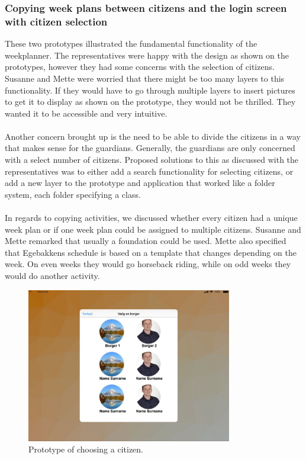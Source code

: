 \subsubsection{Copying week plans between citizens and the login screen with citizen selection}
These two prototypes illustrated the fundamental functionality of the weekplanner.
The representatives were happy with the design as shown on the prototypes, however they had some concerns with the selection of citizens.
Susanne and Mette were worried that there might be too many layers to this functionality.
If they would have to go through multiple layers to insert pictures to get it to display as shown on the prototype, they would not be thrilled.
They wanted it to be accessible and very intuitive.
\\\\
Another concern brought up is the need to be able to divide the citizens in a way that makes sense for the guardians.
Generally, the guardians are only concerned with a select number of citizens.
Proposed solutions to this as discussed with the representatives was to either add a search functionality for selecting citizens, or add a new layer to the prototype and application that worked like a folder system, each folder specifying a class.
\\\\
In regards to copying activities, we discussed whether every citizen had a unique week plan or if one week plan could be assigned to multiple citizens.
Susanne and Mette remarked that usually a foundation could be used.
Mette also specified that Egebakkens schedule is based on a template that changes depending on the week.
On even weeks they would go horseback riding, while on odd weeks they would do another activity.

\begin{figure}[!htb]
    \center
    \includegraphics[width=0.8\textwidth]{figures/select-citizen.JPG}
    \caption{\label{fig:choose-citizen-prototype} Prototype of choosing a citizen.}
\end{figure}

